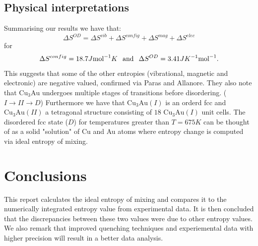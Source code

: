 \documentclass{article}
\begin{document}
\newpage

\subsection{Physical interpretations}
Summarising our results we have that:
$$\Delta S^{OD}=\Delta S^{vib}+\Delta S^{config}
+\Delta S^{mag}+\Delta S^{elec}$$
for
$$\Delta S^{config}=18.7J\text{mol}^{-1}K
\hspace{0.1in}\text{and}\hspace{0.1in}
\Delta S^{OD}=3.41JK^{-1}\text{mol}^{-1}.$$
This suggests that some of the other entropies (vibrational,
magnetic and electronic) are negative valued,
confirmed via Paras and Allanore.\cite{paras}
They also note that
$\text{Cu}_3\text{Au}$ undergoes multiple stages of transitions
before disordering. ($I\rightarrow II\rightarrow D$)
Furthermore we have that $\text{Cu}_3\text{Au}(I)$ is an
orderd fcc and $\text{Cu}_3\text{Au}(II)$ a
tetragonal structure consisting of $18$ $\text{Cu}_3\text{Au}(I)$
unit cells.\cite{okamoto}
The disordered fcc state ($D$) for temperatures greater
than $T=675K$ can be thought of as a solid
"solution" of Cu and Au atoms where entropy change is computed
via ideal entropy of mixing.

\section{Conclusions}
This report calculates the ideal entropy of mixing and
compares it to the numerically integrated entropy value
from experimental data. It is then concluded that
the discrepancies between these two values were due
to other entropy values.
We also remark that improved quenching techniques
and experiemental data with higher precision will result in
a better data analysis.

\printbibliography[title={References}]
\end{document}
